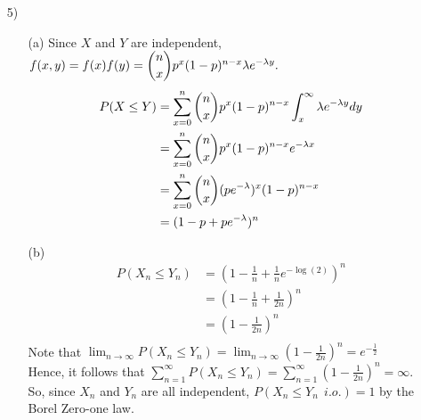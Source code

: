 \begin{enumerate}
\item[5)]
\begin{itemize}
\item[(a)] Since $X$ and $Y$ are independent, $f(x,y)=f(x)f(y) = \dbinom{n}{x}p^{x}(1-p)^{n-x} \lambda e^{-\lambda y}.$\\
\begin{align*}
P(X \leq Y)& = \sum_{x=0}^{n} \dbinom{n}{x}p^{x}(1-p)^{n-x} \int_{x}^{\infty} \lambda e^{-\lambda y} dy\\ 
&= \sum_{x=0}^{n} \dbinom{n}{x}p^{x}(1-p)^{n-x} e^{-\lambda x} 
\\&=  \sum_{x=0}^{n} \dbinom{n}{x}(pe^{-\lambda})^{x}(1-p)^{n-x} 
\\ &=(1 - p + pe^{-\lambda})^{n}
\end{align*}

\item[(b)]  \begin{align*} P(X_{n} \leq Y_{n}) &= (1 - \frac{1}{n} + \frac{1}{n}e^{-\log(2)})^{n} \\
&=  (1 - \frac{1}{n} + \frac{1}{2n})^{n} \\
&= (1 - \frac{1}{2n})^{n}\\
\end{align*}
Note that  $\lim_{n \rightarrow \infty} P(X_{n} \leq Y_{n}) = \lim_{n \rightarrow \infty} (1 - \frac{1}{2n})^{n} = e^{-\frac{1}{2}}$\\
Hence, it follows that $\sum_{n=1}^{\infty} P(X_{n} \leq Y_{n}) = \sum_{n=1}^{\infty} (1 - \frac{1}{2n})^{n} = \infty$.\\ 
So, since $X_{n}$ and $Y_{n}$ are all independent, $P(X_{n} \leq Y_{n} \ \ i.o.) = 1$ by the Borel Zero-one law. 
\end{itemize}
\end{enumerate}